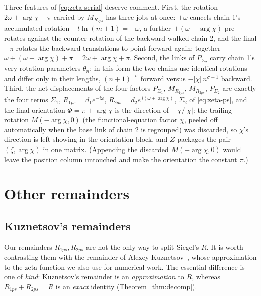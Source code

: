 \documentclass[11pt]{article}
\theoremstyle{definition}
\begin{document}
Three features of \eqref{eq:zeta-serial}
deserve comment. First, the rotation $2\omega+\arg\chi+\pi$ carried by
$M_{R_{2ps}}$ has three jobs at once: $+\omega$ cancels chain 1's
accumulated rotation $-t\ln(m+1)=-\omega$, a
further $+(\omega+\arg\chi)$ pre-rotates against the counter-rotation of
the backward-walked chain 2, and the final $+\pi$ rotates the backward
translations to point forward again; together
$\omega+(\omega+\arg\chi)+\pi=2\omega+\arg\chi+\pi$. Second, the links of
$P_{\Sigma_2}$ carry chain 1's very rotation parameters $\theta_n$:
in this form the two chains use identical rotations and differ only in
their lengths, $(n+1)^{-\sigma}$ forward versus $-|\chi|\,n^{\sigma-1}$
backward. Third, the net displacements of the four factors $P_{\Sigma_1}$,
$M_{R_{1ps}}$, $M_{R_{2ps}}$, $P_{\Sigma_2}$ are exactly the four terms
$\Sigma_1$, $R_{1ps}=d_1e^{-i\omega}$,
$R_{2ps}=d_2e^{\,i(\omega+\arg\chi)}$, $\Sigma_2$ of \eqref{eq:zeta-ps},
and the final orientation $\Phi=\pi+\arg\chi$ is the direction of
$-\chi/|\chi|$: the trailing rotation $M(-\arg\chi,0)$ (the
functional-equation factor $\chi$, peeled off automatically when the base
link of chain 2 is regrouped) was discarded, so $\chi$'s direction is
left showing in the orientation block, and $Z$ packages the pair
$(\zeta,\arg\chi)$ in one matrix. (Appending the discarded
$M(-\arg\chi,0)$ would leave the position column untouched and make the
orientation the constant $\pi$.)

\section{Other remainders}\label{sec:other-remainders}

\subsection{Kuznetsov's remainders}\label{sec:kuznetsov}

Our remainders $R_{1ps},R_{2ps}$ are not the only way to split Siegel's $R$. It is worth
contrasting them with the remainder of Alexey Kuznetsov~\cite{Kuznetsov2025},
whose approximation to the zeta function we also use for numerical work. The
essential difference is one of \emph{kind}: Kuznetsov's remainder is
an \emph{approximation} to $R$, whereas $R_{1ps}+R_{2ps}=R$ is an \emph{exact}
identity (Theorem~\ref{thm:decomp}).
\end{document}
